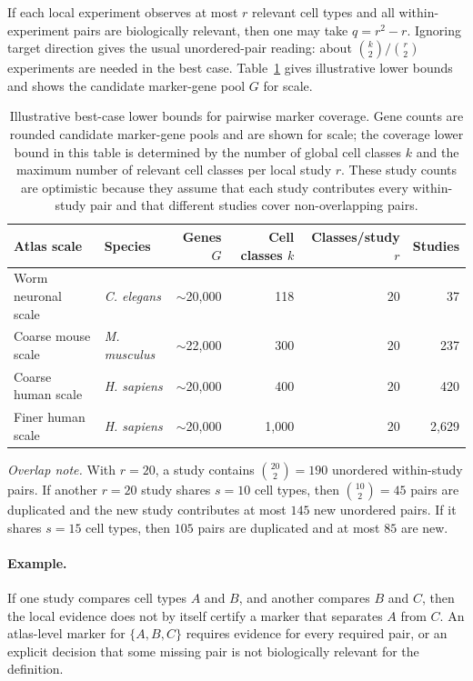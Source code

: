 \documentclass{article}
\begin{document}
If each local experiment observes at most $r$ relevant cell types and all within-experiment pairs are biologically relevant, then one may take $q=r^2-r$. Ignoring target direction gives the usual unordered-pair reading: about $\binom{k}{2}/\binom{r}{2}$ experiments are needed in the best case. Table~\ref{tab:experiment-coverage-scale} gives illustrative lower bounds and shows the candidate marker-gene pool $G$ for scale.

\begin{table}[h]
\centering
\small
\begin{tabular}{llrrrr}
\toprule
Atlas scale & Species & Genes $G$ & Cell classes $k$ & Classes/study $r$ & Studies \\
\midrule
Worm neuronal scale & \textit{C. elegans} & $\sim$20{,}000 & 118 & 20 & 37 \\
Coarse mouse scale & \textit{M. musculus} & $\sim$22{,}000 & 300 & 20 & 237 \\
Coarse human scale & \textit{H. sapiens} & $\sim$20{,}000 & 400 & 20 & 420 \\
Finer human scale & \textit{H. sapiens} & $\sim$20{,}000 & 1{,}000 & 20 & 2{,}629 \\
\bottomrule
\end{tabular}
\caption{Illustrative best-case lower bounds for pairwise marker coverage. Gene counts are rounded candidate marker-gene pools and are shown for scale; the coverage lower bound in this table is determined by the number of global cell classes $k$ and the maximum number of relevant cell classes per local study $r$. These study counts are optimistic because they assume that each study contributes every within-study pair and that different studies cover non-overlapping pairs.}
\label{tab:experiment-coverage-scale}
\end{table}

\noindent\emph{Overlap note.}
With $r=20$, a study contains $\binom{20}{2}=190$ unordered within-study pairs. If another $r=20$ study shares $s=10$ cell types, then $\binom{10}{2}=45$ pairs are duplicated and the new study contributes at most $145$ new unordered pairs. If it shares $s=15$ cell types, then $105$ pairs are duplicated and at most $85$ are new.

\paragraph{Example.}
If one study compares cell types $A$ and $B$, and another compares $B$ and $C$, then the local evidence does not by itself certify a marker that separates $A$ from $C$. An atlas-level marker for $\{A,B,C\}$ requires evidence for every required pair, or an explicit decision that some missing pair is not biologically relevant for the definition.
\end{document}
